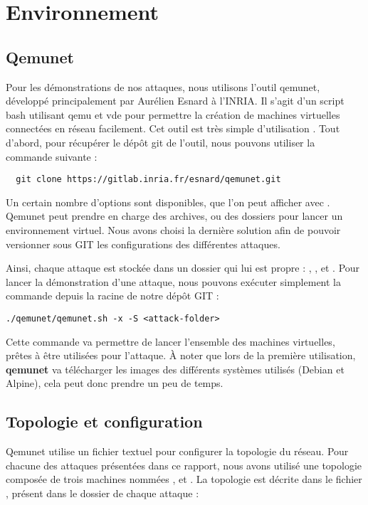 \chapter{Environnement}

\section{Qemunet}

Pour les démonstrations de nos attaques, nous utilisons l'outil qemunet, développé principalement par Aurélien Esnard à l'INRIA. Il s'agit d'un script bash utilisant qemu et vde pour permettre la création de machines virtuelles connectées en réseau facilement. Cet outil est très simple d'utilisation \cite{qemunet}. Tout d'abord, pour récupérer le dépôt git de l'outil, nous pouvons utiliser la commande suivante :

\begin{verbatim}
  git clone https://gitlab.inria.fr/esnard/qemunet.git
\end{verbatim}

Un certain nombre d'options sont disponibles, que l'on peut afficher avec . Qemunet peut prendre en charge des archives, ou des dossiers pour lancer un environnement virtuel. Nous avons choisi la dernière solution afin de pouvoir versionner sous GIT les configurations des différentes attaques.

Ainsi, chaque attaque est stockée dans un dossier qui lui est propre : , ,  et . Pour lancer la démonstration d'une attaque, nous pouvons exécuter simplement la commande depuis la racine de notre dépôt GIT :

\begin{verbatim}
./qemunet/qemunet.sh -x -S <attack-folder>
\end{verbatim}

Cette commande va permettre de lancer l'ensemble des machines virtuelles, prêtes à être utilisées pour l'attaque. À noter que lors de la première utilisation, \textbf{qemunet} va télécharger les images des différents systèmes utilisés (Debian et Alpine), cela peut donc prendre un peu de temps.

\section{Topologie et configuration}

Qemunet utilise un fichier textuel pour configurer la topologie du réseau. Pour chacune des attaques présentées dans ce rapport, nous avons utilisé une topologie composée de trois machines nommées ,  et . La topologie est décrite dans le fichier , présent dans le dossier de chaque attaque :

